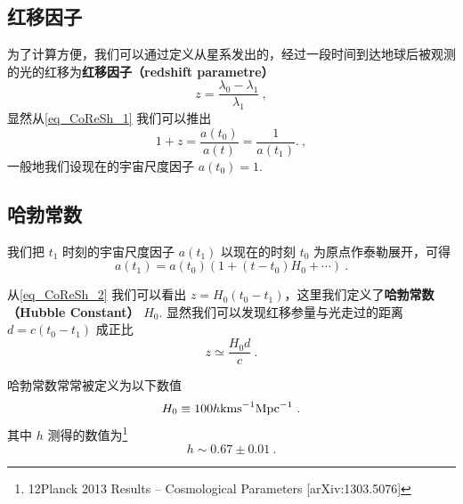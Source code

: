 \subsection{红移因子}
为了计算方便，我们可以通过定义从星系发出的，经过一段时间到达地球后被观测的光的红移为\textbf{红移因子（redshift parametre）}
\begin{equation}
z=\frac{\lambda_0-\lambda_1}{\lambda_1}~,
\end{equation}
显然从\autoref{eq_CoReSh_1} 我们可以推出
\begin{equation}
1+z=\frac{a(t_0)}{a(t)}=\frac{1}{a(t_1)}. \label{eq_CoReSh_2}~,
\end{equation}
一般地我们设现在的宇宙尺度因子 $a(t_0)=1$.

\subsection{哈勃常数}
我们把 $t_1$ 时刻的宇宙尺度因子 $a(t_1)$ 以现在的时刻 $t_0$ 为原点作泰勒展开，可得
\begin{equation}
a(t_1)=a(t_0)(1+(t-t_0)H_0+\cdots)~.
\end{equation}

从\autoref{eq_CoReSh_2} 我们可以看出 $z=H_0(t_0-t_1)$，这里我们定义了\textbf{哈勃常数（Hubble Constant）} $H_0$. 显然我们可以发现红移参量与光走过的距离 $d=c(t_0-t_1)$ 成正比
\begin{equation}
z\simeq\frac{H_0d}{c}~.
\end{equation}

哈勃常数常常被定义为以下数值
\begin{equation}
H_0 \equiv100 h {\rm kms}^{-1}{\rm Mpc}^{-1}~.
\end{equation}
其中 $h$ 测得的数值为\footnote{12Planck 2013 Results – Cosmological Parameters [arXiv:1303.5076]}
\begin{equation}
h\sim 0.67 \pm 0.01~.
\end{equation}
